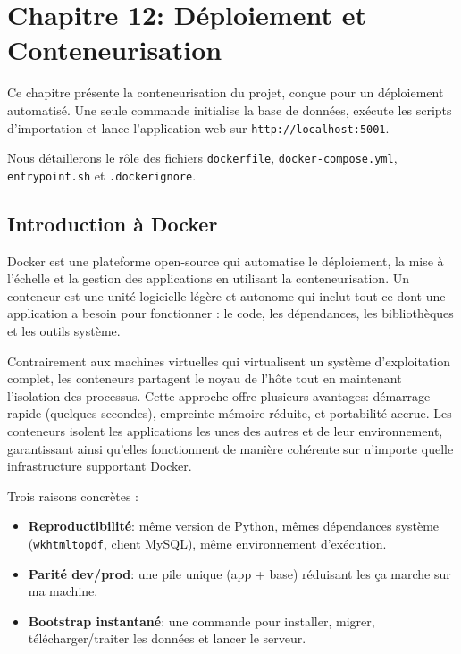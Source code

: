 \chapter{Chapitre 12: Déploiement et Conteneurisation}
\label{chap:deploiement}

Ce chapitre présente la conteneurisation du projet, conçue pour un déploiement automatisé. Une seule commande initialise la base de données, exécute les scripts d'importation et lance l'application web sur \texttt{http://localhost:5001}.

Nous détaillerons le rôle des fichiers \texttt{dockerfile}, \texttt{docker-compose.yml}, \texttt{entrypoint.sh} et \texttt{.dockerignore}.

\section{Introduction à Docker}
Docker est une plateforme open-source qui automatise le déploiement, la mise à l'échelle et la gestion des applications en utilisant la conteneurisation. Un conteneur est une unité logicielle légère et autonome qui inclut tout ce dont une application a besoin pour fonctionner : le code, les dépendances, les bibliothèques et les outils système. 

Contrairement aux machines virtuelles qui virtualisent un système d'exploitation complet, les conteneurs partagent le noyau de l'hôte tout en maintenant l'isolation des processus. Cette approche offre plusieurs avantages: démarrage rapide (quelques secondes), empreinte mémoire réduite, et portabilité accrue. Les conteneurs isolent les applications les unes des autres et de leur environnement, garantissant ainsi qu'elles fonctionnent de manière cohérente sur n'importe quelle infrastructure supportant Docker.


Trois raisons concrètes :
\begin{itemize}
  \item \textbf{Reproductibilité}: même version de Python, mêmes dépendances système (\texttt{wkhtmltopdf}, client MySQL), même environnement d'exécution.
  \item \textbf{Parité dev/prod}: une pile unique (app + base) réduisant les \og ça marche sur ma machine\fg{}.
  \item \textbf{Bootstrap instantané}: une commande pour installer, migrer, télécharger/traiter les données et lancer le serveur.
\end{itemize}

